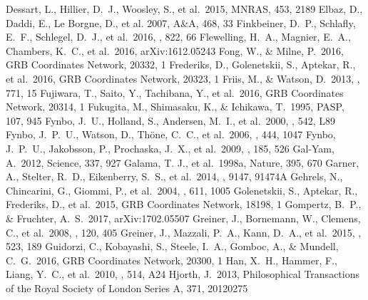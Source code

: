 \documentclass[traditabstract,longauth]{aa}
\begin{document}
\begin{thebibliography}{99}
 Dessart, L., Hillier, D.~J., Woosley, S., et al.\ 2015, MNRAS, 453, 2189 
 Elbaz, D., Daddi, E., Le Borgne, D., et al. 2007, A\&A, 468, 33
 Finkbeiner, D.~P., Schlafly, E.~F., Schlegel, D.~J., et al.\ 2016, \apj, 822, 66 
 Flewelling, H.~A., Magnier, E.~A., Chambers, K.~C., et al.\ 2016, arXiv:1612.05243 
 Fong, W., \& Milne, P.\ 2016, GRB Coordinates Network, 20332, 1 
 Frederiks, D., Golenetskii, S., Aptekar, R., et al.\ 2016, GRB Coordinates Network, 20323, 1 
 Friis, M., \& Watson, D.\ 2013, \apj, 771, 15 
 Fujiwara, T., Saito, Y., Tachibana, Y., et al.\ 2016, GRB Coordinates Network, 20314, 1 
 Fukugita, M., Shimasaku, K., \& Ichikawa, T.\ 1995, PASP, 107, 945
 Fynbo, J.~U., Holland, S., Andersen, M.~I., et al.\ 2000, \apjl, 542, L89 
 Fynbo, J.~P.~U., Watson, D., Th{\"o}ne, C.~C., et al.\ 2006, \nat, 444, 1047 
 Fynbo, J.~P.~U., Jakobsson, P., Prochaska, J.~X., et al.\ 2009, \apjs, 185, 526 
 Gal-Yam, A.\ 2012, Science, 337, 927 
 Galama, T. J., et al.\ 1998a, Nature, 395, 670
 Garner, A., Stelter, R.~D., Eikenberry, S.~S., et al.\ 2014, \procspie, 9147, 91474A 
 Gehrels, N., Chincarini, G., Giommi, P., et al.\ 2004, \apj, 611, 1005 
 Golenetskii, S., Aptekar, R., Frederiks, D., et al.\ 2015, GRB Coordinates Network, 18198, 1 
 Gompertz, B.~P., \& Fruchter, A.~S.\ 2017, arXiv:1702.05507 
 Greiner, J., Bornemann, W., Clemens, C., et al.\ 2008, \pasp, 120, 405 
 Greiner, J., Mazzali, P.~A., Kann, D.~A., et al.\ 2015, \nat, 523, 189 
 Guidorzi, C., Kobayashi, S., Steele, I.~A., Gomboc, A., \& Mundell, C.~G.\ 2016, GRB Coordinates Network, 20300, 1 
 Han, X.~H., Hammer, F., Liang, Y.~C., et al.\ 2010, \aap, 514, A24 
 Hjorth, J.\ 2013, Philosophical Transactions of the Royal Society of London Series A, 371, 20120275 

\end{thebibliography}
\end{document}
